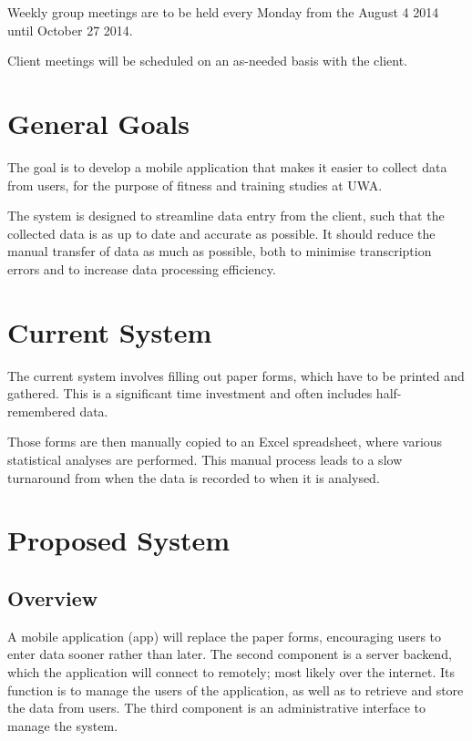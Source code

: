 \documentclass[a4paper, 11pt, titlepage]{article}
\begin{document}
Weekly group meetings are to be held every Monday from the August 4 2014 until October 27 2014. 

Client meetings will be scheduled on an as-needed basis with the client.

\pagebreak

\begingroup
\linespread{0.7}
\hypersetup{linkcolor=black}
\tableofcontents
\endgroup

\pagebreak
{}

\section{General Goals}
The goal is to develop a mobile application that makes it easier to collect data from users, for the purpose of fitness and training studies at UWA.

The system is designed to streamline data entry from the client, such that the collected data is as up to date and accurate as possible. It should reduce the manual transfer of data as much as possible, both to minimise transcription errors and to increase data processing efficiency. 

\section{Current System}
The current system involves filling out paper forms, which have to be printed and gathered. This is a significant time investment and often includes half-remembered data. 

Those forms are then manually copied to an Excel spreadsheet, where various statistical analyses are performed. This manual process leads to a slow turnaround from when the data is recorded to when it is analysed.

\section{Proposed System}
\subsection{Overview}
A mobile application (app) will replace the paper forms, encouraging users to enter data sooner rather than later. The second component is a server backend, which the application will connect to remotely; most likely over the internet. Its function is to manage the users of the application, as well as to retrieve and store the data from users. The third component is an administrative interface to manage the system.
\end{document}
